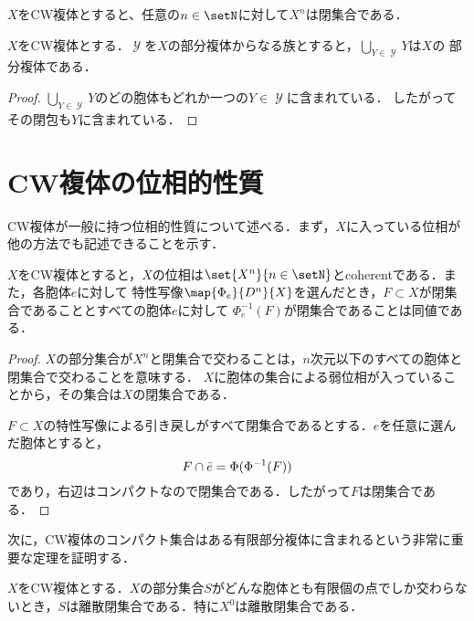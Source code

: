 \documentclass[uplatex]{jsarticle}
\newcommand{\setinverse}[2]{#1 ^{-1}(#2)}
\begin{document}
\begin{corollary}
  $X$をCW複体とすると、任意の$n\in \setN$に対して$X^n$は閉集合である．
\end{corollary}

\begin{proposition}\label{subcomplex union}
  $X$をCW複体とする．$\mscrY$を$X$の部分複体からなる族とすると，$\bigcup_{Y\in \mscrY} Y$は$X$の
  部分複体である．
\end{proposition}

\begin{proof}
  $\bigcup_{Y\in \mscrY} Y$のどの胞体もどれか一つの$Y\in \mscrY$に含まれている．
  したがってその閉包も$Y$に含まれている．
\end{proof}

\section{CW複体の位相的性質}

CW複体が一般に持つ位相的性質について述べる．まず，$X$に入っている位相が他の方法でも記述できることを示す．

\begin{proposition}
  $X$をCW複体とすると，$X$の位相は$\set{X^n}{n\in \setN}$とcoherentである．また，各胞体$e$に対して
  特性写像$\map{\Phi_e}{D^n}{X}$を選んだとき，$F\subset X$が閉集合であることとすべての胞体$e$に対して
  $\setinverse{\Phi_e}{F}$が閉集合であることは同値である．
\end{proposition}

\begin{proof}
  $X$の部分集合が$X^n$と閉集合で交わることは，$n$次元以下のすべての胞体と閉集合で交わることを意味する．
  $X$に胞体の集合による弱位相が入っていることから，その集合は$X$の閉集合である．

  $F\subset X$の特性写像による引き戻しがすべて閉集合であるとする．$e$を任意に選んだ胞体とすると，
  \[ F\cap \Bar{e} = \Phi(\setinverse{\Phi}{F}) \]
  であり，右辺はコンパクトなので閉集合である．したがって$F$は閉集合である．
\end{proof}

次に，CW複体のコンパクト集合はある有限部分複体に含まれるという非常に重要な定理を証明する．

\begin{lemma}\label{discrete}
  $X$をCW複体とする．$X$の部分集合$S$がどんな胞体とも有限個の点でしか交わらないとき，$S$は離散閉集合である．特に$X^0$は離散閉集合である．
\end{lemma}
\end{document}

